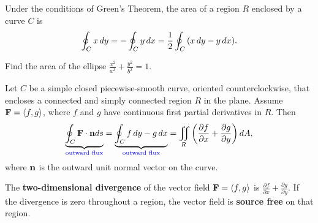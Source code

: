\documentclass[mathNotesPreamble]{subfiles}
\begin{document}
  \begin{thmBox*}
    Under the conditions of Green's Theorem, the area of a region $R$ enclosed by a curve $C$ is
      \[\oint_C x\,dy=-\oint_C y\,dx=\frac{1}{2}\oint_C{\left(x\,dy-y\,dx\right)}.\]
  \end{thmBox*}

  \begin{ex*}
    Find the area of the ellipse $\displaystyle \frac{x^2}{a^2}+\frac{y^2}{b^2}=1$.
  \end{ex*}
  \pagebreak

  \begin{thmBox*}
    Let $C$ be a simple closed piecewise-smooth curve, oriented counterclockwise, that encloses a connected and simply connected region $R$ in the plane. Assume $\mathbf F={\left\langle f,g \right\rangle}$, where $f$ and $g$ have continuous first partial derivatives in $R$. Then
      \[\underbrace{\oint_C \mathbf F\cdot {\mathbf{n}} ds}_{\textcolor{blue}{\textnormal{outward flux}}}=\underbrace{\oint_C f\,dy-g\,dx}_{\textcolor{blue}{\textnormal{outward flux}}}=\iint\limits_R{\left(\frac{\partial f}{\partial x}+\frac{\partial g}{\partial y}\right)}\,dA,\]
    where ${\mathbf{n}}$ is the outward unit normal vector on the curve.
  \end{thmBox*}

  \begin{defn*}
    The \textbf{two-dimensional divergence} of the vector field $\mathbf F={\left\langle f,g \right\rangle}$ is $\displaystyle \frac{\partial f}{\partial x}+\frac{\partial g}{\partial y}$. If the divergence is zero throughout a region, the vector field is \textbf{source free} on that region.
  \end{defn*}
\end{document}
